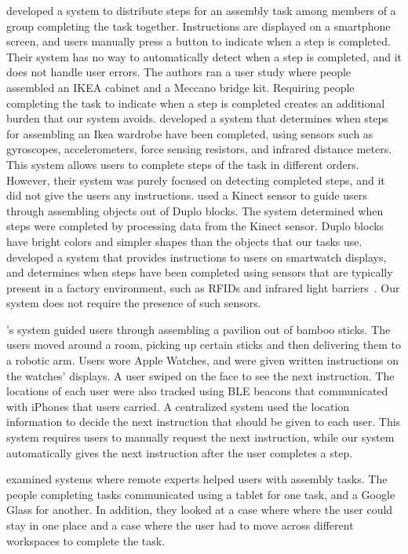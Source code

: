 \citet{webuild} developed a system to distribute steps for an assembly task
among members of a group completing the task together. Instructions are
displayed on a smartphone screen, and users manually press a
button to indicate when a step is completed.
Their system has no way to automatically detect when a step is completed, and
it does not handle user errors.
The authors ran a user study where people assembled an IKEA cabinet and a
Meccano bridge kit.
Requiring people completing the task to indicate when a step is completed
creates an additional burden that our system avoids.
\citet{sensors} developed a system that
determines when steps for assembling an Ikea wardrobe have been completed, using
sensors such as gyroscopes, accelerometers, force sensing resistors, and
infrared distance meters. This system allows users to complete steps of the task
in different orders.
However, their system was purely focused on detecting completed steps, and it
did not give the users any instructions.
\citet{kinect} used a Kinect
sensor to guide users through assembling objects out of Duplo blocks. The system
determined when steps were completed by processing data from the Kinect sensor.
Duplo blocks have bright colors and simpler shapes than the objects that our
tasks use.
\citet{smartwatch} developed a system that provides instructions to users on
smartwatch displays, and determines when steps have been completed using sensors
that are typically present in a factory environment, such as RFIDs and infrared
light barriers~\cite{smartwatch2}.
Our system does not require the presence of such sensors.

\citet{robotic_arm}'s system guided users through assembling a pavilion out of
bamboo sticks. The users moved around a room, picking up certain sticks and
then delivering them to a robotic arm. Users wore Apple Watches, and were given
written instructions on the watches' displays. A user swiped on the face to see
the next instruction. The locations of each user were also tracked using BLE
beacons that communicated with iPhones that users carried. A centralized system
used the location information to decide the next instruction that should be
given to each user.
This system requires users to manually request the next instruction, while our
system automatically gives the next instruction after the user completes a step.

\citet{collaboration} examined systems where remote experts helped users with
assembly tasks. The people completing tasks communicated using a tablet for one
task, and a Google Glass for another. In addition,
they looked at a case where where the user could stay in one place and a case
where the user had to move across different workspaces to complete the task.

